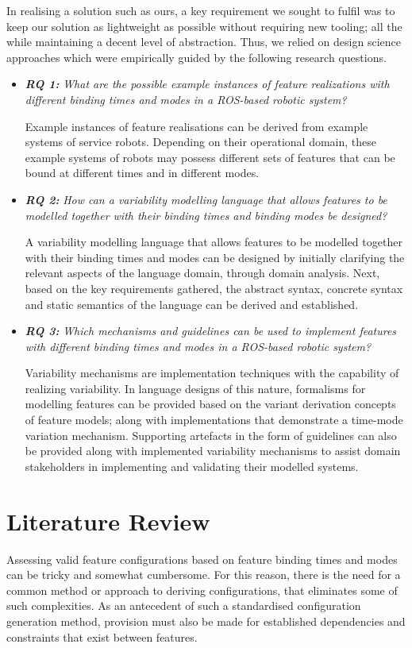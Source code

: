 \documentclass[conference]{IEEEtran}
\begin{document}
In realising a solution such as ours, a key requirement we sought to fulfil was to keep our solution as lightweight as possible without requiring new tooling; all the while maintaining a decent level of abstraction. Thus, we relied on design science approaches which were empirically guided by the following research questions.
\begin{itemize}
     \item \textit{\textbf{RQ 1:}} \emph{What are the possible example instances of feature realizations with different binding times and modes in a ROS-based robotic system?}
     
     Example instances of feature realisations can be derived from example systems of service robots. Depending on their operational domain, these example systems of robots may possess different sets of features that can be bound at different times and in different modes.
    
    \item \textit{\textbf{RQ 2:}} \emph{How can a variability modelling language that allows features to be modelled together with their binding times and binding modes be designed?}
    
    A variability modelling language that allows features to be modelled together with their binding times and modes can be designed by initially clarifying the relevant aspects of the language domain, through domain analysis. Next, based on the key requirements gathered, the abstract syntax, concrete syntax and static semantics of the language can be derived and established.
    
    \item \textit{\textbf{RQ 3:}} \emph{Which mechanisms and guidelines can be used to implement features with different binding times and modes in a ROS-based robotic system?}
    
    Variability mechanisms are implementation techniques with the capability of realizing variability. In language designs of this nature, formalisms for modelling features can be provided based on the variant derivation concepts of feature models; along with implementations that demonstrate a time-mode variation mechanism. Supporting artefacts in the form of guidelines can also be provided along with implemented variability mechanisms to assist domain stakeholders in implementing and validating their modelled systems.
\end{itemize}

\section{Literature Review}
Assessing valid feature configurations based on feature binding times and modes can be tricky and somewhat cumbersome. For this reason, there is the need for a common method or approach to deriving configurations, that eliminates some of such complexities. As an antecedent of such a standardised configuration generation method, provision must also be made for established dependencies and constraints that exist between features.
\end{document}
